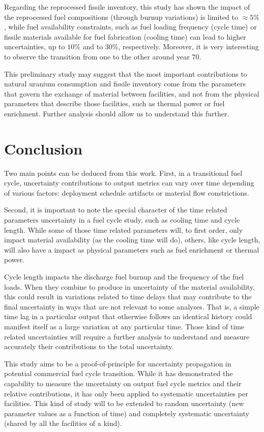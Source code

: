 \documentclass{anstrans}
\begin{document}
Regarding the reprocessed fissile inventory, this study has shown the 
impact of the reprocessed fuel compositions (through burnup variations) is
limited to $\approx5\%$, while fuel availability constraints, such as fuel loading frequency (cycle
time) or fissile materials available for fuel fabrication (cooling time) can lead to higher
uncertainties, up to $10\%$ and to $30\%$, respectively.  Moreover, it is very
interesting to observe the transition from one to the other around
year 70.

This preliminary study may suggest that the most important contributions to
natural uranium consumption and fissile inventory come from the parameters that
govern the exchange of material between facilities, and not
from the physical parameters that describe those facilities, such as thermal power or fuel enrichment. Further
analysis should allow us to understand this further.

\section{Conclusion}

Two main points can be deduced from this work.  First, in a transitional
fuel cycle, uncertainty contributions to output metrics can vary over time
depending of various factors: deployment schedule artifacts or material flow constrictions.

Second, it is important to note the special character of the time related
parameters uncertainty in a fuel cycle study, such as cooling time and cycle
length.  While some of those time related parameters will, to first order, only
impact material availability (as the cooling time will do), others, like
cycle length, will also have a impact as physical parameters such as fuel
enrichment or thermal power.  

Cycle length impacts the discharge fuel burnup and  the frequency of
the fuel loads.  When they combine to produce in uncertainty of the
material availability, this could result in variations related to time delays that may
contribute to the final uncertainty in ways that are not relevant to some analyses.
That is, a simple time lag in a particular output that otherwise follows an identical history
could manifest itself as a large variation at any particular time.
Those kind of time related uncertainties will require a further analysis
to understand and measure accurately their
contributions to the total uncertainty.

This study aims to be a proof-of-principle for uncertainty propagation in
potential commercial fuel cycle transition.  While it has demonstrated the
capability to measure the uncertainty on output fuel cycle metrics and their
relative contributions, it has only been applied to systematic uncertainties per
facilities.
This kind of study will to be extended to random uncertainty (new parameter
values as a function of time) and completely systematic uncertainty (shared by all
the facilities of a kind).
\end{document}
